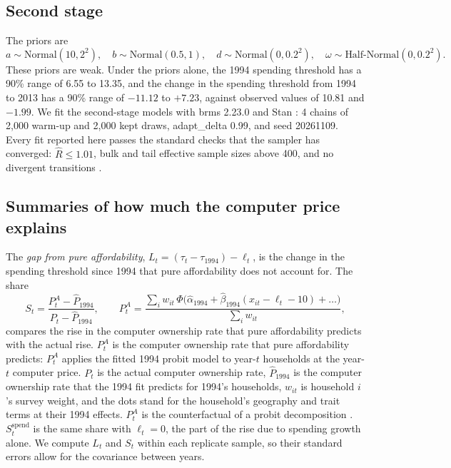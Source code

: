 \documentclass[11pt]{article}
\begin{document}
\begin{table}[!htbp]
\centering
\caption{Cross-validated log score of each link function (10-fold within each year, weighted, summed over 1994--2013): difference from the probit link, with its standard error. Higher is better.}
\label{tab:links}

\end{table}

\subsection{Second stage}
\label{app:secondstage}

The priors are
\[
a \sim \text{Normal}(10, 2^2), \quad b \sim \text{Normal}(0.5, 1), \quad d \sim \text{Normal}(0, 0.2^2), \quad \omega \sim \text{Half-Normal}(0, 0.2^2).
\]
These priors are weak. Under the priors alone, the 1994 spending threshold has a 90\% range of 6.55 to 13.35, and the change in the spending threshold from 1994 to 2013 has a 90\% range of $-11.12$ to $+7.23$, against observed values of 10.81 and $-1.99$. We fit the second-stage models with brms 2.23.0 and Stan \citep{burkner2017,carpenter2017}: 4 chains of 2{,}000 warm-up and 2{,}000 kept draws, adapt\_delta 0.99, and seed 20261109. Every fit reported here passes the standard checks that the sampler has converged: $\hat R \le 1.01$, bulk and tail effective sample sizes above 400, and no divergent transitions \citep{vehtari2021}.

\subsection{Summaries of how much the computer price explains}
\label{app:summaries}

The \emph{gap from pure affordability}, $L_t = (\tau_t - \tau_{1994}) - \ell_t$, is the change in the spending threshold since 1994 that pure affordability does not account for. The share
\begin{equation}
S_t = \frac{P^A_t - \hat P_{1994}}{P_t - \hat P_{1994}}, \qquad P^A_t = \frac{\sum_i w_{it}\,\Phi\big(\hat\alpha_{1994} + \hat\beta_{1994}(x_{it} - \ell_t - 10) + \dots\big)}{\sum_i w_{it}},
\end{equation}
compares the rise in the computer ownership rate that pure affordability predicts with the actual rise. $P^A_t$ is the computer ownership rate that pure affordability predicts: $P^A_t$ applies the fitted 1994 probit model to year-$t$ households at the year-$t$ computer price. $P_t$ is the actual computer ownership rate, $\hat P_{1994}$ is the computer ownership rate that the 1994 fit predicts for 1994's households, $w_{it}$ is household $i$'s survey weight, and the dots stand for the household's geography and trait terms at their 1994 effects. $P^A_t$ is the counterfactual of a probit decomposition \citep{fairlie2005}. $S^{\text{spend}}_t$ is the same share with $\ell_t = 0$, the part of the rise due to spending growth alone. We compute $L_t$ and $S_t$ within each replicate sample, so their standard errors allow for the covariance between years.
\end{document}
